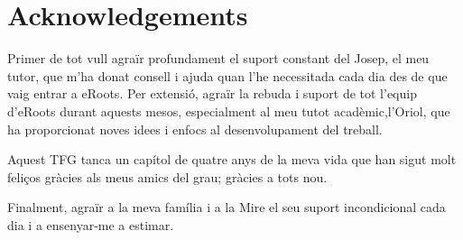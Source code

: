 \documentclass[a4paper,11pt, titlepage, twoside]{article}
\begin{document}
\section*{Acknowledgements}

Primer de tot vull agraïr profundament el suport constant del Josep, el meu tutor, que m'ha donat consell i ajuda quan
l'he necessitada cada dia des de que vaig entrar a eRoots. Per extensió, agraïr la rebuda i suport de tot l'equip d'eRoots durant aquests mesos,
especialment al meu tutot acadèmic,l'Oriol, que ha proporcionat noves idees i enfocs al desenvolupament del treball.\par

Aquest TFG tanca un capítol de quatre anys de la meva vida que han sigut molt feliços gràcies als meus amics del grau; gràcies a tots nou.\par 
Finalment, agraïr a la meva família i a la Mire el seu suport incondicional cada dia i a ensenyar-me a estimar.
 
\end{document}
